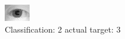 \begin{figure}[h!]
\begin{center}
\includegraphics[width=0.60\columnwidth]{figures/ID1174_class_2_target_3.png}
\end{center}
\caption{ Classification: 2 actual target: 3}
\label{fig:ID1174_class_2_target_3}
\end{figure}
